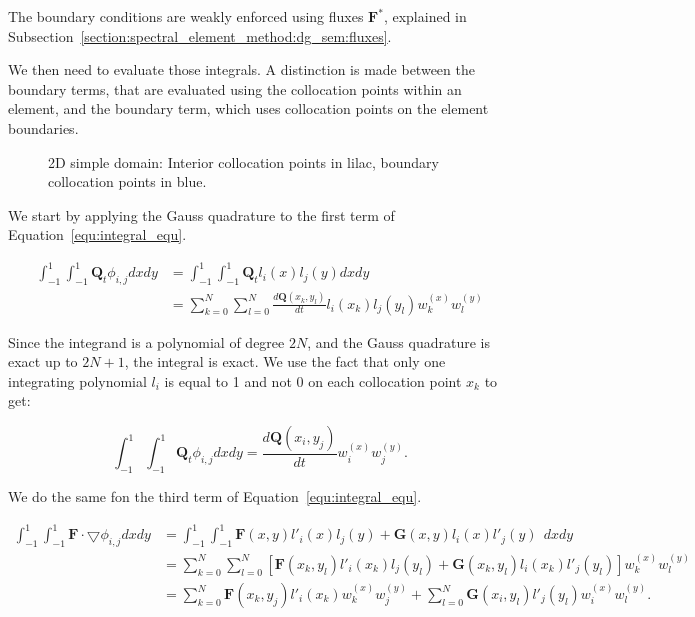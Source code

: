 The boundary conditions are weakly enforced using fluxes $\mathbf{F}^*$, explained in
Subsection~\ref{section:spectral_element_method:dg_sem:fluxes}. 

We then need to evaluate those integrals. A distinction is made between the boundary terms, that are
evaluated using the collocation points within an element, and the boundary term, which uses
collocation points on the element boundaries.

\begin{figure}[H]
	\centering
	
	\caption{2D simple domain: Interior collocation points in lilac, boundary collocation points in blue.}
	\label{fig:domain_nodes}
\end{figure}

We start by applying the Gauss quadrature to the first term of Equation~\ref{equ:integral_equ}.

\begin{equation}
	\begin{split}
        \int_{-1}^{1}\int_{-1}^{1} \mathbf{Q}_t \phi_{i, j} dx dy 
        &= \int_{-1}^{1}\int_{-1}^{1}\mathbf{Q}_t l_i(x) l_j(y) dx dy \\
        &= \sum_{k = 0}^{N} \sum_{l = 0}^{N}\frac{d\mathbf{Q} \left( x_k, y_l \right)}{dt} l_i(x_k) l_j(y_l) w_k^{(x)} w_l^{(y)}
	\end{split}
\end{equation}

Since the integrand is a polynomial of degree $2 N$, and the Gauss quadrature is exact up to $2 N +
1$, the integral is exact. We use the fact that only one integrating polynomial $l_i$ is equal to 1
and not 0 on each collocation point $x_k$ to get:

\begin{equation} \label{equ:integral_1}
    \int_{-1}^{1}\int_{-1}^{1} \mathbf{Q}_t \phi_{i, j} dx dy 
    = \frac{d\mathbf{Q} \left( x_i, y_j \right)}{dt} w_i^{(x)} w_j^{(y)}.
\end{equation}

We do the same fon the third term of Equation~\ref{equ:integral_equ}.

\begin{equation} \label{equ:integral_3}
	\begin{split}
		\int_{-1}^{1}\int_{-1}^{1}\mathbf{F} \cdot \bigtriangledown \phi_{i, j} dx dy 
		&= \int_{-1}^{1}\int_{-1}^{1}\mathbf{F}(x, y) l'_i(x)l_j(y) + \mathbf{G}(x, y) l_i(x) l'_j(y) \:\: dx dy \\ 
		&= \sum_{k = 0}^{N} \sum_{l = 0}^{N}\left [ \mathbf{F}(x_k, y_l)l'_i(x_k)l_j(y_l) + \mathbf{G}(x_k, y_l) l_i(x_k)l'_j(y_l) \right ]w_k^{(x)} w_l^{(y)} \\
		&= \sum_{k = 0}^{N} \mathbf{F}(x_k, y_j)l'_i(x_k)w_k^{(x)} w_j^{(y)} + \sum_{l = 0}^{N}\mathbf{G}(x_i, y_l) l'_j(y_l) w_i^{(x)} w_l^{(y)}.
	\end{split}
\end{equation}

